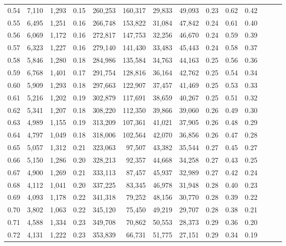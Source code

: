 \begin{tabular}{rrrrrrrrrrrrrr}
0.54 &  7,110 &  1,293 &  0.15 &  260,253 &  160,317 &  29,833 &  49,093 &  0.23 &  0.62 &      0.42 \\
0.55 &  6,495 &  1,251 &  0.16 &  266,748 &  153,822 &  31,084 &  47,842 &  0.24 &  0.61 &      0.40 \\
0.56 &  6,069 &  1,172 &  0.16 &  272,817 &  147,753 &  32,256 &  46,670 &  0.24 &  0.59 &      0.39 \\
0.57 &  6,323 &  1,227 &  0.16 &  279,140 &  141,430 &  33,483 &  45,443 &  0.24 &  0.58 &      0.37 \\
0.58 &  5,846 &  1,280 &  0.18 &  284,986 &  135,584 &  34,763 &  44,163 &  0.25 &  0.56 &      0.36 \\
0.59 &  6,768 &  1,401 &  0.17 &  291,754 &  128,816 &  36,164 &  42,762 &  0.25 &  0.54 &      0.34 \\
0.60 &  5,909 &  1,293 &  0.18 &  297,663 &  122,907 &  37,457 &  41,469 &  0.25 &  0.53 &      0.33 \\
0.61 &  5,216 &  1,202 &  0.19 &  302,879 &  117,691 &  38,659 &  40,267 &  0.25 &  0.51 &      0.32 \\
0.62 &  5,341 &  1,207 &  0.18 &  308,220 &  112,350 &  39,866 &  39,060 &  0.26 &  0.49 &      0.30 \\
0.63 &  4,989 &  1,155 &  0.19 &  313,209 &  107,361 &  41,021 &  37,905 &  0.26 &  0.48 &      0.29 \\
0.64 &  4,797 &  1,049 &  0.18 &  318,006 &  102,564 &  42,070 &  36,856 &  0.26 &  0.47 &      0.28 \\
0.65 &  5,057 &  1,312 &  0.21 &  323,063 &   97,507 &  43,382 &  35,544 &  0.27 &  0.45 &      0.27 \\
0.66 &  5,150 &  1,286 &  0.20 &  328,213 &   92,357 &  44,668 &  34,258 &  0.27 &  0.43 &      0.25 \\
0.67 &  4,900 &  1,269 &  0.21 &  333,113 &   87,457 &  45,937 &  32,989 &  0.27 &  0.42 &      0.24 \\
0.68 &  4,112 &  1,041 &  0.20 &  337,225 &   83,345 &  46,978 &  31,948 &  0.28 &  0.40 &      0.23 \\
0.69 &  4,093 &  1,178 &  0.22 &  341,318 &   79,252 &  48,156 &  30,770 &  0.28 &  0.39 &      0.22 \\
0.70 &  3,802 &  1,063 &  0.22 &  345,120 &   75,450 &  49,219 &  29,707 &  0.28 &  0.38 &      0.21 \\
0.71 &  4,588 &  1,334 &  0.23 &  349,708 &   70,862 &  50,553 &  28,373 &  0.29 &  0.36 &      0.20 \\
0.72 &  4,131 &  1,222 &  0.23 &  353,839 &   66,731 &  51,775 &  27,151 &  0.29 &  0.34 &      0.19 \\

\end{tabular}
